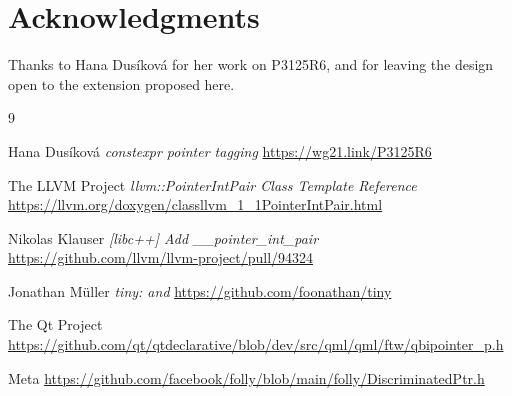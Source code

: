 \documentclass{wg21}
\begin{document}


\section{Acknowledgments}

Thanks to Hana Dusíková for her work on P3125R6, and for leaving the design open to the extension proposed here.




\renewcommand{\section}[2]{}%

\begin{thebibliography}{9}

Hana Dusíková
\emph{constexpr pointer tagging}\newline
\url{https://wg21.link/P3125R6}

The LLVM Project
\emph{llvm::PointerIntPair Class Template Reference}\newline
\url{https://llvm.org/doxygen/classllvm_1_1PointerIntPair.html}

Nikolas Klauser
\emph{[libc++] Add \_\_pointer\_int\_pair}\newline
\url{https://github.com/llvm/llvm-project/pull/94324}

Jonathan Müller
\emph{tiny:  and }\newline
\url{https://github.com/foonathan/tiny}

The Qt Project
\emph{}\newline
\url{https://github.com/qt/qtdeclarative/blob/dev/src/qml/qml/ftw/qbipointer_p.h}

Meta
\emph{}\newline
\url{https://github.com/facebook/folly/blob/main/folly/DiscriminatedPtr.h}

\end{thebibliography}
\end{document}
